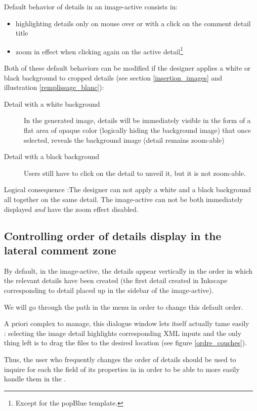 Default behavior of details in an image-active consists in:
\begin{itemize}
 \item highlighting details only on mouse over or with a click on the comment 
 detail title
 \item zoom in effect when clicking again on the active detail\footnote{Except 
 for the popBlue template.}
\end{itemize}

Both of these default behaviors can be modified if the designer applies a white
 or black background to cropped details (see section 
\ref{insertion_images} 
 and illustration 
\ref{remplissage_blanc}):
\begin{description}
 \item [Detail with a white background] In the generated image, details will be
 immediately visible in the form of a flat area of opaque color (logically hiding the background image) that once selected, reveals the background image (detail remains zoom-able)
 \item [Detail with a black background] Users still have to click on the detail to unveil it, but it is not zoom-able.
\end{description}

Logical consequence :The designer can not apply a white and a black
background all together on the same detail. The image-active can not be 
both immediately displayed \textit{and} have the zoom effect disabled.

\subsection{Controlling order of details display in the lateral comment zone}

By default, in the image-active, the details appear vertically in the order in which the relevant details have been created (the first detail created in Inkscape corresponding to detail placed up in the sidebar of the image-active).

We will go through the path  in the  menu in order to change this default order.

A priori complex to manage, this dialogue window lets itself actually tame easily : selecting the image detail highlights corresponding XML inputs and the only thing left is to drag the files to the desired location (see figure \ref{ordre_couches}).

Thus, the user who frequently changes the order of details should be used to inquire for each the field  of its properties in in order to be able to more easily handle them in the .


